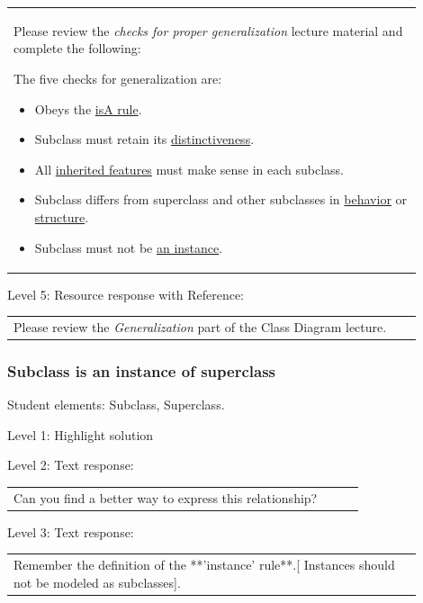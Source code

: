 \begin{tabular}{|p{0.9\linewidth}}

Please review the \textit{checks for proper generalization} lecture material
and complete the following:

The five checks for generalization are:

\begin{itemize}
    \item Obeys the \underline{isA rule}.
    \item Subclass must retain its \underline{distinctiveness}.
    \item All \underline{inherited features} must make sense in each subclass.
    \item Subclass differs from superclass and other subclasses in \underline{behavior} or \underline{structure}.
    \item Subclass must not be \underline{an instance}.
\end{itemize}

\end{tabular} \medskip

\noindent Level 5: Resource response with Reference: \medskip

\begin{tabular}{|p{0.9\linewidth}}
Please review the \textit{Generalization} part of the Class Diagram lecture.
\end{tabular} \medskip


\subsubsection{Subclass is an instance of superclass}

Student elements: Subclass, Superclass.  \medskip

\noindent Level 1: Highlight solution  \medskip

\noindent Level 2: Text response: \medskip

\begin{tabular}{|p{0.9\linewidth}}
Can you find a better way to express this relationship?
\end{tabular} \medskip

\noindent Level 3: Text response: \medskip

\begin{tabular}{|p{0.9\linewidth}}
Remember the definition of the **'instance' rule**.[ Instances should not be modeled as subclasses].
\end{tabular} \medskip

